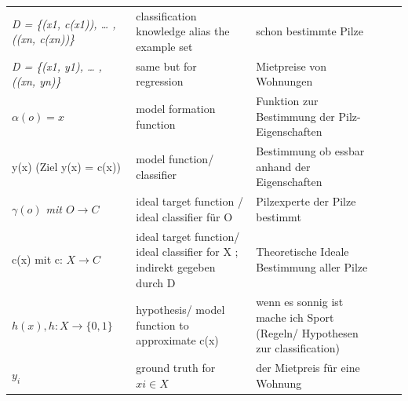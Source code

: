 \documentclass[11pt,a4paper]{article}
\begin{document}
\begin{flushleft}
\begin{table}[]
\begin{tabular}{lllll}
\textit{D = \{(x1, c(x1)), … , ((xn, c(xn))\}}                         & classification knowledge alias the example set                                     & schon bestimmte Pilze                                                                                                &  &  \\
\textit{D = \{(x1, y1), … , ((xn, yn)\}}                               & same but for regression                                                            & Mietpreise von Wohnungen                                                                                             &  &  \\
$\alpha(o) = x$                                                               & model formation function                                                           & Funktion zur Bestimmung der Pilz-Eigenschaften                                                                       &  &  \\
y(x) (Ziel y(x) = c(x))                                                & model function/ classifier                                                         & Bestimmung ob essbar anhand der Eigenschaften                                                                        &  &  \\
\textit{$\gamma(o)$ mit $O \rightarrow C$}                                                & ideal target function / ideal classifier für O                                     & Pilzexperte der Pilze bestimmt                                                                                       &  &  \\
c(x) mit c: $X \rightarrow C$                                                      & ideal target function/ ideal classifier for X ; indirekt gegeben durch D           & Theoretische Ideale Bestimmung aller Pilze                                                                           &  &  \\
$h(x), h: X \rightarrow \{0,1\}$                                                   & hypothesis/ model function  to approximate c(x)                                    & wenn es sonnig ist mache ich Sport (Regeln/ Hypothesen  zur classification)                                          &  &  \\
$y_i$                                                                     & ground truth for $xi \in X $                                                            & der Mietpreis für eine Wohnung                                                                                       &  &  \\

\end{tabular}
\end{table}
\end{flushleft}
\end{document}
